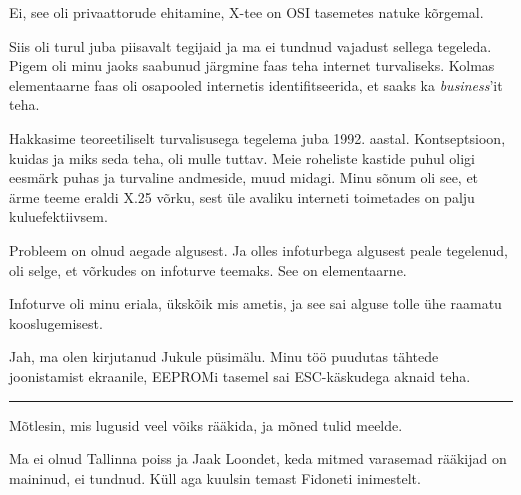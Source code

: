 
Ei, see oli privaattorude ehitamine, X-tee on OSI tasemetes 
natuke kõrgemal.


Siis oli turul juba piisavalt tegijaid ja ma ei tundnud vajadust 
sellega tegeleda. Pigem oli minu jaoks saabunud järgmine faas teha 
internet turvaliseks. Kolmas elementaarne faas 
oli osapooled internetis identifitseerida, et saaks ka
\emph{business}'it teha. 


Hakkasime teoreetiliselt turvalisusega tegelema juba 
1992. aastal. Kontseptsioon, kuidas ja miks seda 
teha, oli mulle tuttav. Meie roheliste kastide puhul oligi 
eesmärk puhas ja turvaline andmeside, muud midagi. Minu sõnum oli see, 
et ärme teeme eraldi X.25 võrku, sest üle avaliku interneti toimetades on palju 
kuluefektiivsem.


Probleem on olnud aegade algusest. Ja olles infoturbega algusest 
peale tegelenud, oli selge, et võrkudes on infoturve teemaks. See on 
elementaarne. 


Infoturve oli minu eriala, ükskõik mis 
ametis, ja see sai alguse tolle 
ühe raamatu kooslugemisest.


Jah, ma olen kirjutanud Jukule püsimälu. 
Minu töö puudutas tähtede joonistamist ekraanile, EEPROMi tasemel 
sai ESC-käskudega aknaid teha. 

\bigskip
\noindent\rule{.3\textwidth}{.7pt}
\bigskip

Mõtlesin, mis lugusid veel võiks rääkida, ja mõned tulid meelde.

Ma ei olnud Tallinna poiss ja Jaak Loondet, keda 
mitmed varasemad rääkijad on maininud, ei tundnud. Küll aga kuulsin temast 
Fidoneti inimestelt. 

